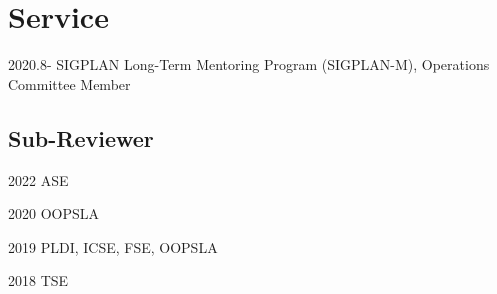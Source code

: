 \documentclass[12pt,letterpaper]{report}
\newcommand{\listitemspace}{0.15em}
\renewenvironment{itemize}
{\begin{list}{}{\setlength{\leftmargin}{0em}
			\setlength{\parskip}{0em}
			\setlength{\itemsep}{\listitemspace}
			\setlength{\parsep}{\listitemspace}}}
	{\end{list}}
\begin{document}
\vspace{-0.5em}
\section*{Service}
\begin{tablist}
	\item[2020.8-] \tab SIGPLAN Long-Term Mentoring Program (SIGPLAN-M), Operations Committee Member
\end{tablist}

\subsection*{Sub-Reviewer}
\begin{tablist}
	\item[2022] \tab ASE
	\item[2020] \tab OOPSLA
	\item[2019] \tab PLDI, ICSE, FSE, OOPSLA
	\item[2018] \tab TSE
\end{tablist}


%
%
%
%
%
%
%
%
%
%
%
\end{document}
